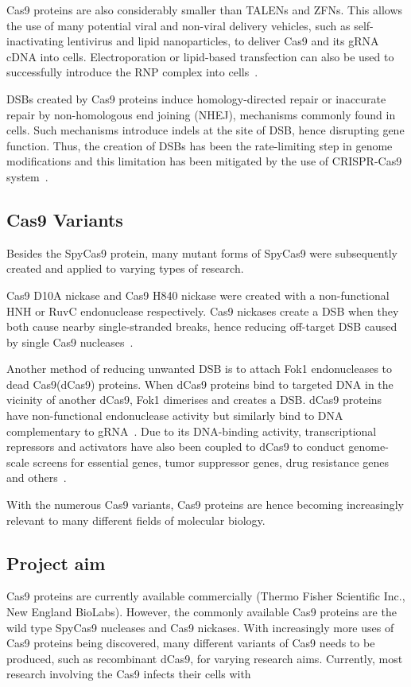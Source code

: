 \documentclass[11pt]{article}
\begin{document}
Cas9 proteins are also considerably smaller than TALENs and ZFNs. This allows the use of many potential viral and non-viral delivery vehicles, such as self-inactivating lentivirus and lipid nanoparticles, to deliver Cas9 and its gRNA cDNA into cells. Electroporation or lipid-based transfection can also be used to successfully introduce the RNP complex into cells~\citep{Gori2015}.

DSBs created by Cas9 proteins induce homology-directed repair or inaccurate repair by non-homologous end joining (NHEJ), mechanisms commonly found in cells. Such mechanisms introduce indels at the site of DSB, hence disrupting gene function. Thus, the creation of DSBs has been the rate-limiting step in genome modifications and this limitation has been mitigated by the use of CRISPR-Cas9 system~\citep{Chen2015a, Ramalingam2013}. 

\subsection{Cas9 Variants}
Besides the SpyCas9 protein, many mutant forms of SpyCas9 were subsequently created and applied to varying types of research. 

Cas9 D10A nickase and Cas9 H840 nickase were created with a non-functional HNH or RuvC endonuclease respectively. Cas9 nickases create a DSB when they both cause nearby single-stranded breaks, hence reducing off-target DSB caused by single Cas9 nucleases~\citep{Ran2013}. 

Another method of reducing unwanted DSB is to attach Fok1 endonucleases to dead Cas9(dCas9) proteins. When dCas9 proteins bind to targeted DNA in the vicinity of another dCas9, Fok1 dimerises and creates a DSB. dCas9 proteins have non-functional endonuclease activity but similarly bind to DNA complementary to gRNA~\citep{Guilinger2014c}. Due to its DNA-binding activity, transcriptional repressors and activators have also been coupled to dCas9 to conduct genome-scale screens for essential genes, tumor suppressor genes, drug resistance genes and others~\citep{Gilbert2014, Shalem2015}. 

With the numerous Cas9 variants, Cas9 proteins are hence becoming increasingly relevant to many different fields of molecular biology.

\subsection{Project aim}
Cas9 proteins are currently available commercially (Thermo Fisher Scientific Inc., New England BioLabs). However, the commonly available Cas9 proteins are the wild type SpyCas9 nucleases and Cas9 nickases. With increasingly more uses of Cas9 proteins being discovered, many different variants of Cas9 needs to be produced, such as recombinant dCas9, for varying research aims. Currently, most research involving the Cas9 infects their cells with 
\end{document}

